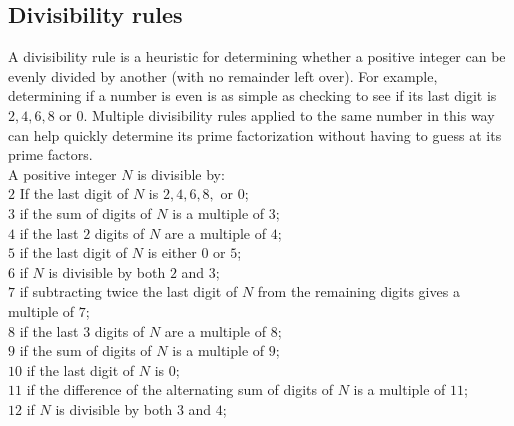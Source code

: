 \documentclass{article} %
\begin{document}
\subsection{Divisibility rules}
A divisibility rule is a heuristic for determining whether a positive integer can be evenly divided by another (with no remainder left over). For example, determining if a number is even is as simple as checking to see if its last digit is $2, 4, 6, 8$ or $0$. Multiple divisibility rules applied to the same number in this way can help quickly determine its prime factorization without having to guess at its prime factors.\\
A positive integer $N$ is divisible by:\\
$2$ If the last digit of $N$ is $2, 4, 6, 8,$ or $0$;\\
$3$ if the sum of digits of $N$ is a multiple of $3$;\\
$4$ if the last $2$ digits of $N$ are a multiple of $4$;\\
$5$ if the last digit of $N$ is either $0$ or $5$;\\
$6$ if $N$ is divisible by both $2$ and $3$;\\
$7$ if subtracting twice the last digit of $N$ from the remaining digits gives a multiple of $7$;\\
$8$ if the last $3$ digits of $N$ are a multiple of  $8$;\\
$9$ if the sum of digits of $N$ is a multiple of $9$;\\
$10$ if the last digit of $N$ is $0$;\\
$11$ if the difference of the alternating sum of digits of $N$ is a multiple of $11$;\\
$12$ if $N$ is divisible by both $3$ and $4$;\\
\end{document}
